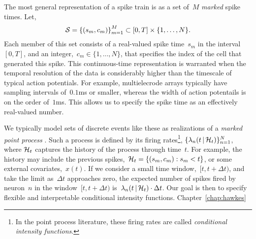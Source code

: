 The most general representation of a spike train is as a set of~$M$
\emph{marked} spike times.
Let,
\begin{align}
  \mathcal{S} = \left \{ (s_m, c_m) \right \}_{m=1}^M \subset [0, T] \times \{1, \ldots, N\}.
\end{align}
Each member of this set consists of a real-valued spike time~$s_m$ in
the interval~$[0, T]$, and an integer,~$c_m \in \{1, \ldots, N\}$,
that specifies the index of the cell that generated this spike. 
This continuous-time representation is
warranted when the temporal resolution of the data is considerably
higher than the timescale of typical action potentials. For example,
multielecrode arrays typically have sampling intervals of~$0.1$ms or
smaller, whereas the width of action potentails is on the order
of~$1$ms. This allows us to specify the spike time as an effectively
real-valued number.  

We typically model sets of discrete events like these as realizations
of a \emph{marked point process} \cite{daley2003introduction1}. Such a
process is defined by its firing rates\footnote{In the point process
  literature, these firing rates are called \emph{conditional
    intensity functions}.},
${\{\lambda_n(t \,|\, \mathcal{H}_t)\}_{n=1}^N}$, where $\mathcal{H}_t$ captures
the history of the process through time~$t$. For example, the history
may include the previous spikes,~${\mathcal{H}_t = \{(s_m, c_m): s_m < t\}}$,
or some external covariates,~$x(t)$.  If we consider a small time
window,~${[t, t+\Delta t)}$, and take the limit as~$\Delta t$
approaches zero, the expected number of spikes fired by neuron~$n$ in
the window~${[t, t+\Delta t)}$
is~${\lambda_n(t \,|\, \mathcal{H}_t) \cdot \Delta t}$. Our
goal is then to specify flexible and interpretable conditional intensity
functions. Chapter~\ref{chap:hawkes} 

